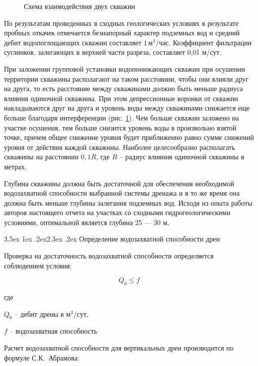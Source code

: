 \documentclass[a4paper,12pt]{article} %
\makeatletter
\renewcommand\section{\@startsection {section}{1}{\parindent}%
	{3.5ex \@plus 1ex \@minus .2ex}{2.3ex \@plus.2ex}%
	{\normalfont\hyphenpenalty=10000\Large\bfseries}}
\makeatother
\begin{document}
\begin{figure}[!h]
	\centering
	\caption{Схема взаимодействия двух скважин}
	\label{img:scheme2}
\end{figure}

По результатам проведенных в сходных геологических условиях в результате пробных откачек отмечается безнапорный характер подземных вод и средний дебит водопоглощающих скважин составляет $1 \, м^3/час$. Коэффициент фильтрации суглинков, залегающих в верхней части разреза, составляет 0,01 м/сут. 

При заложении групповой установки водопонижающих скважин при осушении территории скважины располагают на таком расстоянии, чтобы они влияли друг на друга, то есть расстояние между скважинами должно быть меньше радиуса влияния одиночной скважины. При этом депрессионные воронки от скважин накладываются друг на друга  и уровень воды между скважинами снижается еще больше благодаря интерференции (рис. \ref{img:scheme2}). Чем больше скважин заложено на участке осушения, тем больше снизится уровень воды в произвольно взятой точке, причем общее снижение уровня будет приближенно равно сумме снижений уровня от действия каждой скважины. Наиболее целесообразно располагать скважины на расстоянии  $0,1R$, где $R$ – радиус влияния одиночной скважины в метрах. 

Глубина скважины должна быть достаточной для обеспечения необходимой водозахватной способности выбранной системы дренажа и в то же время она должна быть меньше глубины залегания подземных вод. Исходя из опыта работы авторов настоящего отчета на участках со сходными гидрогеологическими условиями, оптимальной является глубина 25 --- 30 м.


\section{Определение водозахватной способности дрен}

Проверка на достаточность водозахватной способности определяется соблюдением условия:

\begin{equation}\label{eq:debit}
	Q_0 \leqslant f 
\end{equation}

	где 
	
	$Q_0$ -- дебит дрены в $м^3/сут$, 
	
	$f$ -- водозахватная способность

	\bigskip

Расчет водозахватной способности  для вертикальных дрен производится по формуле \mbox{С.К. Абрамова}:
\end{document}

